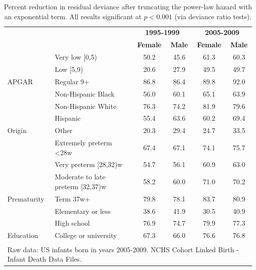 \documentclass[10pt, twoside, parskip=half]{article}
\begin{document}
\begin{table}[t]

\caption{\label{tab:tab-deviances}Percent reduction in residual deviance after truncating the power-law hazard with an exponential term. All results significant at $p<0.001$ (via deviance ratio tests).}
\centering
\begin{tabular}{llcccc}
\toprule
\multicolumn{2}{c}{\textbf{ }} & \multicolumn{2}{c}{\textbf{1995-1999}} & \multicolumn{2}{c}{\textbf{2005-2009}} \\
\cmidrule(l{3pt}r{3pt}){3-4} \cmidrule(l{3pt}r{3pt}){5-6}
\textbf{} & \textbf{} & \textbf{Female} & \textbf{Male} & \textbf{Female} & \textbf{Male}\\
\midrule
 & Very low [0,5) & 50.2 & 45.6 & 61.3 & 60.3\\

 & Low [5,9) & 20.6 & 27.9 & 49.5 & 49.7\\

\multirow{-3}{*}{\raggedright\arraybackslash APGAR} & Regular 9+ & 86.8 & 86.4 & 89.8 & 92.0\\
\cmidrule{1-6}
 & Non-Hispanic Black & 56.0 & 60.1 & 65.1 & 63.9\\

 & Non-Hispanic White & 76.3 & 74.2 & 81.9 & 79.6\\

 & Hispanic & 55.4 & 63.6 & 60.2 & 69.4\\

\multirow{-4}{*}{\raggedright\arraybackslash Origin} & Other & 20.3 & 29.4 & 24.7 & 33.5\\
\cmidrule{1-6}
 & Extremely preterm <28w & 67.4 & 67.1 & 74.1 & 75.7\\

 & Very preterm [28,32)w & 54.7 & 56.1 & 60.9 & 63.0\\

 & Moderate to late preterm [32,37)w & 58.2 & 60.0 & 71.0 & 70.2\\

\multirow{-4}{*}{\raggedright\arraybackslash Prematurity} & Term 37w+ & 79.8 & 78.1 & 83.7 & 80.9\\
\cmidrule{1-6}
 & Elementary or less & 38.6 & 41.9 & 30.5 & 40.9\\

 & High school & 76.9 & 74.7 & 79.9 & 77.3\\

\multirow{-3}{*}{\raggedright\arraybackslash Education} & College or university & 67.3 & 66.0 & 76.6 & 76.8\\
\bottomrule
\multicolumn{6}{l}{\textsuperscript{} Raw data: US infants born in years 2005-2009. NCHS Cohort Linked Birth - Infant Death Data Files.}\\
\end{tabular}
\end{table}
\end{document}
